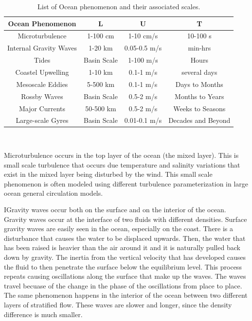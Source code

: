 \begin{center}
\begin{table}[h!]
\begin{tabular}{|c|c|c|c|}
\hline
\textbf{Ocean Phenomenon} & \textbf{L}  &   \textbf{U}  & \textbf{T}  \\
\hline
Microturbulence   & 1-100 cm & 1-10 cm/s & 10-100 s \\

Internal Gravity Waves   & 1-20 km & 0.05-0.5 m/s & min-hrs\\

Tides   & Basin Scale & 1-100 m/s & Hours\\

Coastel Upwelling   & 1-10 km & 0.1-1 m/s & several days\\

Mesoscale Eddies   & 5-500 km & 0.1-1 m/s & Days to Months\\

Rossby Waves & Basin Scale & 0.5-2 m/s & Months to Years\\

Major Currents & 50-500 km & 0.5-2 m/s & Weeks to Seasons\\

Large-scale Gyres  & Basin Scale & 0.01-0.1 m/s & Decades and Beyond\\
\hline
\end{tabular} \\[1ex]
\caption[Scales of ocean phenomenon]{List of Ocean phenomenon and their associated scales. \cite{94CushRoi}}
\label{t:scales}
\end{table}
\end{center}

Microturbulence occurs in the top layer of the ocean (the mixed layer).  This is small scale turbulence that occurs due temperature and salinity variations that exist in the mixed layer being disturbed by the wind.  This small scale phenomenon is often modeled using different turbulence parameterization in large ocean general circulation models.

IGravity waves occur both on the surface and on the interior of the ocean.  Gravity waves occur at the interface of two fluids with different densities.  Surface gravity waves are easily seen in the ocean, especially on the coast.  There is a disturbance that causes the water to be displaced upwards.  Then, the water that has been raised is heavier than the air around it and it is naturally pulled back down by gravity.  The inertia from the vertical velocity that has developed causes the fluid to then penetrate the surface below the equilibrium level.  This process repeats causing oscillations along the surface that make up the waves.  The waves travel becuase of the change in the phase of the oscillations from place to place.  The same phenomenon happens in the interior of the ocean between two different layers of stratified flow.  These waves are slower and longer, since the density difference is much smaller.

